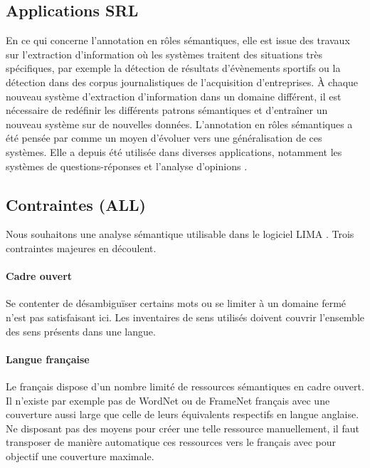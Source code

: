 \subsection{Applications SRL}

En ce qui concerne l'annotation en rôles sémantiques, elle est issue des
travaux sur l'extraction d'information où les systèmes traitent des situations
très spécifiques, par exemple la détection de résultats d'évènements sportifs
ou la détection dans des corpus journalistiques de l'acquisition d'entreprises.
À chaque nouveau système d'extraction d'information dans un domaine différent,
il est nécessaire de redéfinir les différents patrons sémantiques et
d'entraîner un nouveau système sur de nouvelles données. L'annotation en rôles
sémantiques a été pensée par \cite{gildea2002automatic} comme un moyen
d'évoluer vers une généralisation de ces systèmes. Elle a depuis été utilisée
dans diverses applications, notamment les systèmes de questions-réponses
\citep{shen2007using} et l'analyse d'opinions \citep{das2012structure}.

\subsection{Contraintes (ALL)}

Nous souhaitons une analyse sémantique utilisable dans le logiciel LIMA
\citep{besancon2010lima}. Trois contraintes majeures en découlent.

\paragraph{Cadre ouvert} Se contenter de désambiguïser certains mots ou se
limiter à un domaine fermé n'est pas satisfaisant ici. Les inventaires de sens
utilisés doivent couvrir l'ensemble des sens présents dans une langue.

\paragraph{Langue française} Le français dispose d'un nombre limité de
ressources sémantiques en cadre ouvert. Il n'existe par exemple pas de WordNet
ou de FrameNet français avec une couverture aussi large que celle de leurs
équivalents respectifs en langue anglaise. Ne disposant pas des moyens pour
créer une telle ressource manuellement, il faut transposer de manière
automatique ces ressources vers le français avec pour objectif une couverture
maximale.

